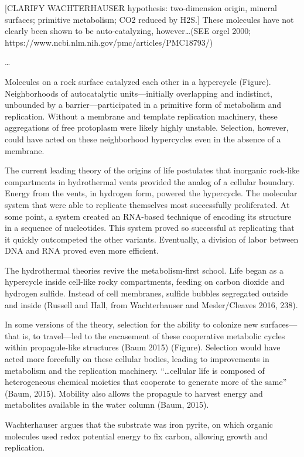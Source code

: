 \documentclass{tufte-book} %
\begin{document}
[CLARIFY WACHTERHAUSER hypothesis: two-dimension origin, mineral surfaces; primitive metabolism; CO2 reduced by H2S.] These molecules have not clearly been shown to be auto-catalyzing, however…(SEE orgel 2000; https://www.ncbi.nlm.nih.gov/pmc/articles/PMC18793/)
	
…

Molecules on a rock surface catalyzed each other in a hypercycle (Figure). Neighborhoods of autocatalytic units—initially overlapping and indistinct, unbounded by a barrier—participated in a primitive form of metabolism and replication. Without a membrane and template replication machinery, these aggregations of free protoplasm were likely highly unstable. Selection, however, could have acted on these neighborhood hypercycles even in the absence of a membrane. 

The current leading theory of the origins of life postulates that inorganic rock-like compartments in hydrothermal vents provided the analog of a cellular boundary. Energy from the vents, in hydrogen form, powered the hypercycle. The molecular system that were able to replicate themselves most successfully proliferated. At some point, a system created an RNA-based technique of encoding its structure in a sequence of nucleotides. This system proved so successful at replicating that it quickly outcompeted the other variants. Eventually, a division of labor between DNA and RNA proved even more efficient. 

The hydrothermal theories revive the metabolism-first school. Life began as a hypercycle inside cell-like rocky compartments, feeding on carbon dioxide and hydrogen sulfide. Instead of cell membranes, sulfide bubbles segregated outside and inside (Russell and Hall, from Wachterhauser and Mesler/Cleaves 2016, 238).

In some versions of the theory, selection for the ability to colonize new surfaces—that is, to travel—led to the encasement of these cooperative metabolic cycles within propagule-like structures (Baum 2015) (Figure). Selection would have acted more forcefully on these cellular bodies, leading to improvements in metabolism and the replication machinery.  “…cellular life is composed of heterogeneous chemical moieties that cooperate to generate more of the same” (Baum, 2015). Mobility also allows the propagule to harvest energy and metabolites available in the water column (Baum, 2015). 


Wachterhauser argues that the substrate was iron pyrite, on which organic molecules used redox potential energy to fix carbon, allowing growth and replication. 
\end{document}
